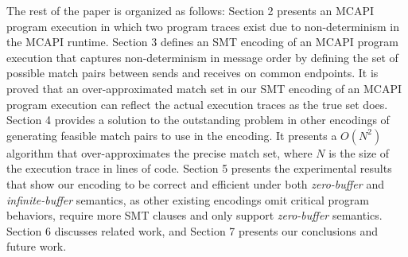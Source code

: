 The rest of the paper is organized as follows:
Section 2 presents an MCAPI program execution in which two program traces exist due to non-determinism in the MCAPI runtime. Section 3 defines an SMT encoding of an MCAPI program execution that captures non-determinism in message order by defining the set of possible match pairs between sends and receives on common endpoints. It is proved that an over-approximated match set in our SMT encoding of an MCAPI program execution can reflect the actual execution traces as the true set does. Section 4 provides a solution to the outstanding problem in other encodings of generating feasible match pairs to use in the encoding. It presents a $O(N^2)$ algorithm that over-approximates the precise match set, where $N$ is the size of the execution trace in lines of code. Section 5 presents the experimental results that show our encoding to be correct and efficient under both \textit{zero-buffer} and \textit{infinite-buffer} semantics, as other existing encodings omit critical program behaviors, require more SMT clauses and only support \textit{zero-buffer} semantics. Section 6 discusses related
work, and Section 7 presents our conclusions and future work.


